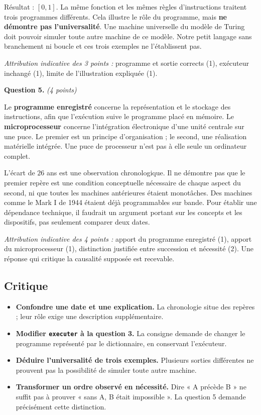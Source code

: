 Résultat : $[0, 1]$. La même fonction et les mêmes règles d'instructions
traitent trois programmes différents. Cela illustre le rôle du programme,
mais \textbf{ne démontre pas l'universalité}. Une machine universelle du modèle
de Turing doit pouvoir simuler toute autre machine de ce modèle. Notre petit
langage sans branchement ni boucle et ces trois exemples ne l'établissent pas.

\emph{Attribution indicative des 3 points :} programme et sortie corrects (1),
exécuteur inchangé (1), limite de l'illustration expliquée (1).

\medskip
\textbf{Question 5.} \emph{(4 points)}

Le \textbf{programme enregistré} concerne la représentation et le stockage des
instructions, afin que l'exécution suive le programme placé en mémoire. Le
\textbf{microprocesseur} concerne l'intégration électronique d'une unité
centrale sur une puce. Le premier est un principe d'organisation ; le second,
une réalisation matérielle intégrée. Une puce de processeur n'est pas à elle
seule un ordinateur complet.

L'écart de $26$ ans est une observation chronologique. Il ne démontre pas que
le premier repère est une condition conceptuelle nécessaire de chaque aspect
du second, ni que toutes les machines antérieures étaient monotâches. Des
machines comme le Mark I de 1944 étaient déjà programmables sur bande. Pour
établir une dépendance technique, il faudrait un argument portant sur les
concepts et les dispositifs, pas seulement comparer deux dates.

\emph{Attribution indicative des 4 points :} apport du programme enregistré (1),
apport du microprocesseur (1), distinction justifiée entre succession et
nécessité (2). Une réponse qui critique la causalité supposée est recevable.

\subsection*{Critique}

\begin{itemize}
  \item \textbf{Confondre une date et une explication.} La chronologie situe
    des repères ; leur rôle exige une description supplémentaire.
  \item \textbf{Modifier \lstinline{executer} à la question 3.} La consigne
    demande de changer le programme représenté par le dictionnaire, en
    conservant l'exécuteur.
  \item \textbf{Déduire l'universalité de trois exemples.} Plusieurs sorties
    différentes ne prouvent pas la possibilité de simuler toute autre machine.
  \item \textbf{Transformer un ordre observé en nécessité.} Dire « A précède B »
    ne suffit pas à prouver « sans A, B était impossible ». La question 5
    demande précisément cette distinction.
\end{itemize}

